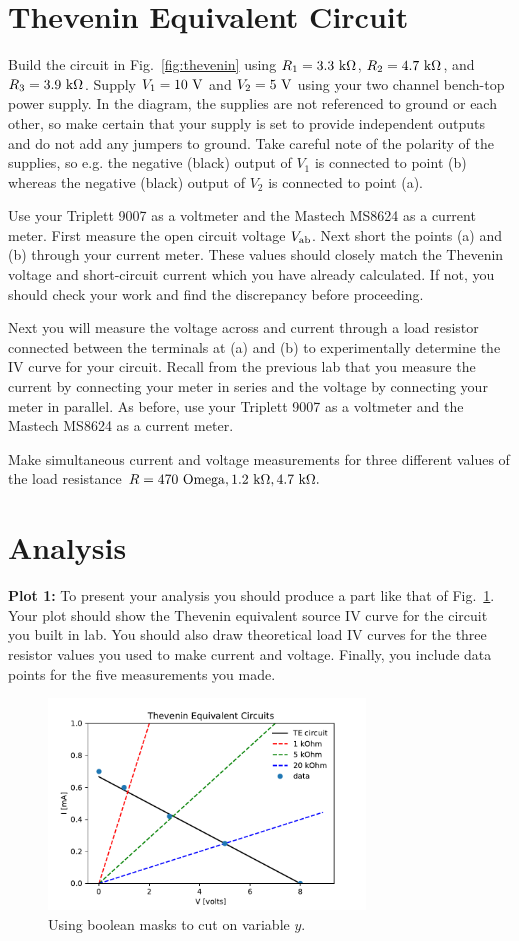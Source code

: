 \section{Thevenin Equivalent Circuit}

Build the circuit in Fig.~\ref{fig:thevenin} using $R_1 = 3.3~\rm k\Omega$, $R_2 = 4.7~\rm k\Omega$, and $R_3 = 3.9~\rm k\Omega$.  Supply $V_1 = 10~\rm V$ and $V_2 = 5~\rm V$ using your two channel bench-top power supply.  In the diagram, the supplies are not referenced to ground or each other, so make certain that your supply is set to provide independent outputs and do not add any jumpers to ground.  Take careful note of the polarity of the supplies, so e.g. the negative (black) output of $V_1$ is connected to point (b) whereas the negative (black) output of $V_2$ is connected to point (a).

Use your Triplett 9007 as a voltmeter and the Mastech MS8624 as a current meter.
First measure the open circuit voltage $V_{\rm ab}$.  Next short the points (a) and (b) through your current meter.  These values should closely match the Thevenin voltage and short-circuit current which you have already calculated.  If not, you should check your work and find the discrepancy before proceeding.

Next you will measure the voltage across and current through a load resistor connected between the terminals at (a) and (b) to experimentally determine the IV curve for your circuit.  Recall from the previous lab that you measure the current by connecting your meter in series and the voltage by connecting your meter in parallel.  As before, use your Triplett 9007 as a voltmeter and the Mastech MS8624 as a current meter.

Make simultaneous current and voltage measurements for three different values of the load resistance $R = 470~{\rm Omega}, 1.2~\rm k\Omega, 4.7~\rm k\Omega.$



\section{Analysis}

{\bf Plot 1:}  To present your analysis you should produce a part like that of Fig.~\ref{fig:egthev}.  Your plot should show the Thevenin equivalent source IV curve for the circuit you built in lab.  You should also draw theoretical load IV curves for the three resistor values you used to make current and voltage.  Finally, you include data points for the five measurements you made.

\begin{figure}[htbp]
\begin{center}
\includegraphics[width=0.75\textwidth]{figs/labs/thevenin/final.pdf} 
\caption{Using boolean masks to cut on variable $y$.}
\label{fig:egthev}
\end{center}
\end{figure}
